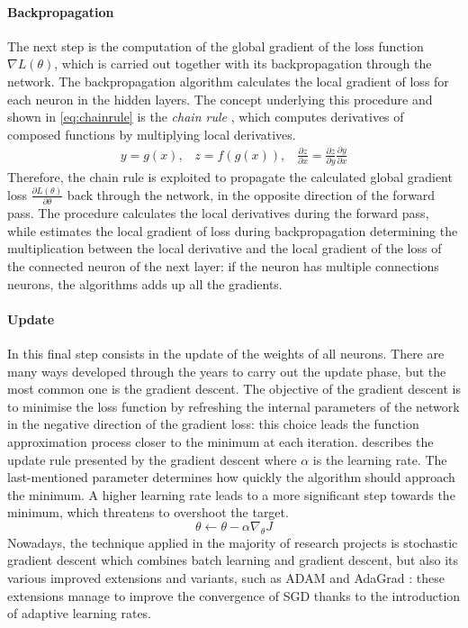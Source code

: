 \paragraph{Backpropagation}
The next step is the computation of the global gradient of the loss function $\nabla L(\theta)$, which is carried out together with its backpropagation through the network. The backpropagation algorithm \cite{rumelhart1988learning} calculates the local gradient of loss for each neuron in the hidden layers. The concept underlying this procedure and shown in \vref{eq:chainrule} is the \textit{chain rule} \cite{lecun2015deep}, which computes derivatives of composed functions by multiplying local derivatives.
\begin{equation}\label{eq:chainrule}
	\begin{gathered}
		y = g(x), \;\;\; z = f(g(x)),  \;\;\;
		\frac{\partial z}{\partial x} = \frac{\partial z}{\partial y} \frac{\partial y}{\partial x}
	\end{gathered}
\end{equation}
Therefore, the chain rule is exploited to propagate the calculated global gradient loss $\frac{\partial L(\theta)}{\partial \theta}$ back through the network, in the opposite direction of the forward pass.
The procedure calculates the local derivatives during the forward pass, while estimates the local gradient of loss during backpropagation determining the multiplication between the local derivative and the local gradient of the loss of the connected neuron of the next layer: if the neuron has multiple connections neurons, the algorithms adds up all the gradients.

\paragraph{Update} In this final step consists in the update of the weights of all neurons. There are many ways developed through the years to carry out the update phase, but the most common one is the gradient descent.
The objective of the gradient descent is to minimise the loss function by refreshing the internal parameters of the network in the negative direction of the gradient loss: this choice leads the function approximation process closer to the minimum at each iteration.  describes the update rule presented by the gradient descent where $\alpha$ is the learning rate. The last-mentioned parameter determines how quickly the algorithm should approach the minimum. A higher learning rate leads to a more significant step towards the minimum, which threatens to overshoot the target.
\begin{equation}\label{eq:update}
	\theta \leftarrow \theta -\alpha \nabla_\theta J
\end{equation}
Nowadays, the technique applied in the majority of research projects is stochastic gradient descent which combines batch learning \cite{stanford2019cs231n} and gradient descent, but also its various improved extensions and variants, such as ADAM \cite{kingma2014adam} and AdaGrad \cite{duchi2011adaptive}: these extensions manage to improve the convergence of SGD thanks to the introduction of adaptive learning rates.

